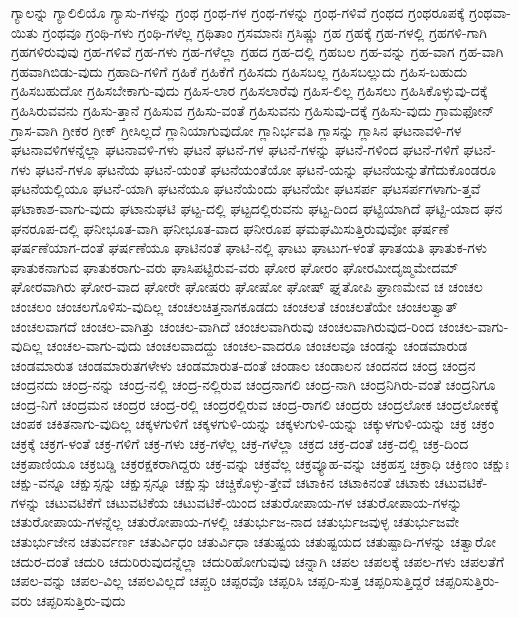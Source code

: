 {ಗ್ಯಾಲನ್ನು
ಗ್ಯಾಲಿಲಿಯೊ
ಗ್ಯಾಸು-ಗಳನ್ನು
ಗ್ರಂಥ
ಗ್ರಂಥ-ಗಳ
ಗ್ರಂಥ-ಗಳನ್ನು
ಗ್ರಂಥ-ಗಳಿವೆ
ಗ್ರಂಥದ
ಗ್ರಂಥರೂಪಕ್ಕೆ
ಗ್ರಂಥವಾ-ಯಿತು
ಗ್ರಂಥವೂ
ಗ್ರಂಥಿ-ಗಳು
ಗ್ರಂಥಿ-ಗಳೆಲ್ಲ
ಗ್ರಥಿತಾಂ
ಗ್ರಸಮಾನಃ
ಗ್ರಸಿಷ್ಣು
ಗ್ರಹ
ಗ್ರಹಕ್ಕೆ
ಗ್ರಹ-ಗಳಲ್ಲಿ
ಗ್ರಹಗಳಿ-ಗಾಗಿ
ಗ್ರಹಗಳಿರುವುವು
ಗ್ರಹ-ಗಳಿವೆ
ಗ್ರಹ-ಗಳು
ಗ್ರಹ-ಗಳೆಲ್ಲಾ
ಗ್ರಹದ
ಗ್ರಹ-ದಲ್ಲಿ
ಗ್ರಹಬಲ
ಗ್ರಹ-ವನ್ನು
ಗ್ರಹ-ವಾಗ
ಗ್ರಹ-ವಾಗಿ
ಗ್ರಹವಾಗಿಬಿಡು-ವುದು
ಗ್ರಹಾದಿ-ಗಳಿಗೆ
ಗ್ರಹಿಕೆ
ಗ್ರಹಿಕೆಗೆ
ಗ್ರಹಿಸದು
ಗ್ರಹಿಸಬಲ್ಲ
ಗ್ರಹಿಸಬಲ್ಲುದು
ಗ್ರಹಿಸ-ಬಹುದು
ಗ್ರಹಿಸಬಹುದೋ
ಗ್ರಹಿಸಬೇಕಾಗು-ವುದು
ಗ್ರಹಿಸ-ಲಾರ
ಗ್ರಹಿಸಲಾರೆವು
ಗ್ರಹಿಸ-ಲಿಲ್ಲ
ಗ್ರಹಿಸಲು
ಗ್ರಹಿಸಿಕೊಳ್ಳುವು-ದಕ್ಕೆ
ಗ್ರಹಿಸಿರುವವನು
ಗ್ರಹಿಸು-ತ್ತಾನೆ
ಗ್ರಹಿಸುವ
ಗ್ರಹಿಸು-ವಂತೆ
ಗ್ರಹಿಸುವನು
ಗ್ರಹಿಸುವು-ದಕ್ಕೆ
ಗ್ರಹಿಸು-ವುದು
ಗ್ರಾಮಫೋನ್
ಗ್ರಾಸ-ವಾಗಿ
ಗ್ರೀಕರ
ಗ್ರೀಕ್
ಗ್ರೀಸಿಲ್ಲದೆ
ಗ್ಲಾನಿಯಾಗುವುದೋ
ಗ್ಲಾನಿರ್ಭವತಿ
ಗ್ಲಾಸನ್ನು
ಗ್ಲಾಸಿನ
ಘಟನಾವಳಿ-ಗಳ
ಘಟನಾವಳಿಗಳನ್ನೆಲ್ಲಾ
ಘಟನಾವಳಿ-ಗಳು
ಘಟನೆ
ಘಟನೆ-ಗಳ
ಘಟನೆ-ಗಳನ್ನು
ಘಟನೆ-ಗಳಿಂದ
ಘಟನೆ-ಗಳಿಗೆ
ಘಟನೆ-ಗಳು
ಘಟನೆ-ಗಳೂ
ಘಟನೆಯ
ಘಟನೆ-ಯಂತೆ
ಘಟನೆಯಂತೆಯೋ
ಘಟನೆ-ಯನ್ನು
ಘಟನೆಯನ್ನುತೆಗೆದುಕೊಂಡರೂ
ಘಟನೆಯಲ್ಲಿಯೂ
ಘಟನೆ-ಯಾಗಿ
ಘಟನೆಯೂ
ಘಟನೆಯೆಂದು
ಘಟನೆಯೇ
ಘಟಸರ್ಪ
ಘಟಸರ್ಪಗಳಾಗು-ತ್ತವೆ
ಘಟಾಕಾಶ-ವಾಗು-ವುದು
ಘಟಾನುಘಟಿ
ಘಟ್ಟ-ದಲ್ಲಿ
ಘಟ್ಟದಲ್ಲಿರುವನು
ಘಟ್ಟ-ದಿಂದ
ಘಟ್ಟಿಯಾಗಿದೆ
ಘಟ್ಟಿ-ಯಾದ
ಘನ
ಘನರೂಪ-ದಲ್ಲಿ
ಘನೀಭೂತ-ವಾಗಿ
ಘನೀಭೂತ-ವಾದ
ಘನೀರೂಪ
ಘಮಘಮಿಸುತ್ತಿರುವುವೋ
ಘರ್ಷಣೆ
ಘರ್ಷಣೆಯಾಗ-ದಂತೆ
ಘರ್ಷಣೆಯೂ
ಘಾಟಿನಂತೆ
ಘಾಟಿ-ನಲ್ಲಿ
ಘಾಟು
ಘಾಟುಗ-ಳಂತೆ
ಘಾತಯತಿ
ಘಾತುಕ-ಗಳು
ಘಾತುಕನಾಗುವ
ಘಾತುಕರಾಗು-ವರು
ಘಾಸಿಪಟ್ಟಿರುವ-ವರು
ಘೋರ
ಘೋರಂ
ಘೋರಮೀದೃಙ್ಮಮೇದಮ್
ಘೋರವಾಗಿರು
ಘೋರ-ವಾದ
ಘೋರೇ
ಘೋಷರು
ಘೋಷೋ
ಘೋಷ್
ಘ್ನತೋಪಿ
ಘ್ರಾಣಮೇವ
ಚ
ಚಂಚಲ
ಚಂಚಲಂ
ಚಂಚಲಗೊಳಿಸು-ವುದಿಲ್ಲ
ಚಂಚಲಚಿತ್ತನಾಗಕೂಡದು
ಚಂಚಲತೆ
ಚಂಚಲತೆಯೇ
ಚಂಚಲತ್ವಾತ್
ಚಂಚಲವಾಗದೆ
ಚಂಚಲ-ವಾಗಿತ್ತು
ಚಂಚಲ-ವಾಗಿದೆ
ಚಂಚಲವಾಗಿರುವು
ಚಂಚಲವಾಗಿರುವುದ-ರಿಂದ
ಚಂಚಲ-ವಾಗು-ವುದಿಲ್ಲ
ಚಂಚಲ-ವಾಗು-ವುದು
ಚಂಚಲವಾದದ್ದು
ಚಂಚಲ-ವಾದರೂ
ಚಂಚಲವೂ
ಚಂಡನ್ನು
ಚಂಡಮಾರುಡ
ಚಂಡಮಾರುತ
ಚಂಡಮಾರುತಗಳೇಳು
ಚಂಡಮಾರುತ-ದಂತೆ
ಚಂಡಾಲ
ಚಂಡಾಲನ
ಚಂದನದ
ಚಂದ್ರ
ಚಂದ್ರನ
ಚಂದ್ರನದು
ಚಂದ್ರ-ನನ್ನು
ಚಂದ್ರ-ನಲ್ಲಿ
ಚಂದ್ರ-ನಲ್ಲಿರುವ
ಚಂದ್ರನಾಗಲಿ
ಚಂದ್ರ-ನಾಗಿ
ಚಂದ್ರನಿಗಿರು-ವಂತೆ
ಚಂದ್ರನಿಗೂ
ಚಂದ್ರ-ನಿಗೆ
ಚಂದ್ರಮನ
ಚಂದ್ರರ
ಚಂದ್ರ-ರಲ್ಲಿ
ಚಂದ್ರರಲ್ಲಿರುವ
ಚಂದ್ರ-ರಾಗಲಿ
ಚಂದ್ರರು
ಚಂದ್ರಲೋಕ
ಚಂದ್ರಲೋಕಕ್ಕೆ
ಚಂಪಕ
ಚಕಿತನಾಗು-ವುದಿಲ್ಲ
ಚಕ್ಕಳಗುಳಿಗೆ
ಚಕ್ಕಳಗುಳಿ-ಯನ್ನು
ಚಕ್ಕಳುಗುಳಿ-ಯನ್ನು
ಚಕ್ಕುಳಗುಳಿ-ಯನ್ನು
ಚಕ್ರ
ಚಕ್ರಂ
ಚಕ್ರಕ್ಕೆ
ಚಕ್ರಗ-ಳಂತೆ
ಚಕ್ರ-ಗಳಿಗೆ
ಚಕ್ರ-ಗಳು
ಚಕ್ರ-ಗಳೆಲ್ಲ
ಚಕ್ರ-ಗಳೆಲ್ಲಾ
ಚಕ್ರದ
ಚಕ್ರ-ದಂತೆ
ಚಕ್ರ-ದಲ್ಲಿ
ಚಕ್ರ-ದಿಂದ
ಚಕ್ರಪಾಣಿಯೂ
ಚಕ್ರಬಡ್ಡಿ
ಚಕ್ರರಕ್ಷಕರಾಗಿದ್ದರು
ಚಕ್ರ-ವನ್ನು
ಚಕ್ರವೆಲ್ಲ
ಚಕ್ರವ್ಯೂಹ-ವನ್ನು
ಚಕ್ರಹಸ್ತ
ಚಕ್ರಾಧಿ
ಚಕ್ರಿಣಂ
ಚಕ್ಷುಃ
ಚಕ್ಷು-ವನ್ನೂ
ಚಕ್ಷುಸ್ಸನ್ನು
ಚಕ್ಷುಸ್ಸನ್ನೂ
ಚಕ್ಷುಸ್ಸು
ಚಚ್ಚಿಕೊಳ್ಳು-ತ್ತೇವೆ
ಚಟಾಕಿನ
ಚಟಾಕಿನಂತೆ
ಚಟಾಕು
ಚಟುವಟಿಕೆ-ಗಳನ್ನು
ಚಟುವಟಿಕೆಗೆ
ಚಟುವಟಿಕೆಯ
ಚಟುವಟಿಕೆ-ಯಿಂದ
ಚತುರೋಪಾಯ-ಗಳ
ಚತುರೋಪಾಯ-ಗಳನ್ನು
ಚತುರೋಪಾಯ-ಗಳನ್ನೆಲ್ಲ
ಚತುರೋಪಾಯ-ಗಳಲ್ಲಿ
ಚತುರ್ಭುಜ-ನಾದ
ಚತುರ್ಭುಜವುಳ್ಳ
ಚತುರ್ಭುಜವೇ
ಚತುರ್ಭುಜೇನ
ಚತುರ್ವರ್ಣ
ಚತುರ್ವಿಧಂ
ಚತುರ್ವಿಧಾ
ಚತುಷ್ಟಯ
ಚತುಷ್ಟಯದ
ಚತುಷ್ಪಾದಿ-ಗಳನ್ನು
ಚತ್ವಾರೋ
ಚದುರ-ದಂತೆ
ಚದುರಿ
ಚದುರಿರುವುದನ್ನೆಲ್ಲಾ
ಚದುರಿಹೋಗುವುವು
ಚನ್ನಾಗಿ
ಚಪಲ
ಚಪಲಕ್ಕೆ
ಚಪಲ-ಗಳು
ಚಪಲತೆಗೆ
ಚಪಲ-ವನ್ನು
ಚಪಲ-ವಿಲ್ಲ
ಚಪಲವಿಲ್ಲದೆ
ಚಪ್ಚರಿ
ಚಪ್ಪರವೊ
ಚಪ್ಪರಿಸಿ
ಚಪ್ಪರಿ-ಸುತ್ತ
ಚಪ್ಪರಿಸುತ್ತಿದ್ದರೆ
ಚಪ್ಪರಿಸುತ್ತಿರು-ವರು
ಚಪ್ಪರಿಸುತ್ತಿರು-ವುದು
}
